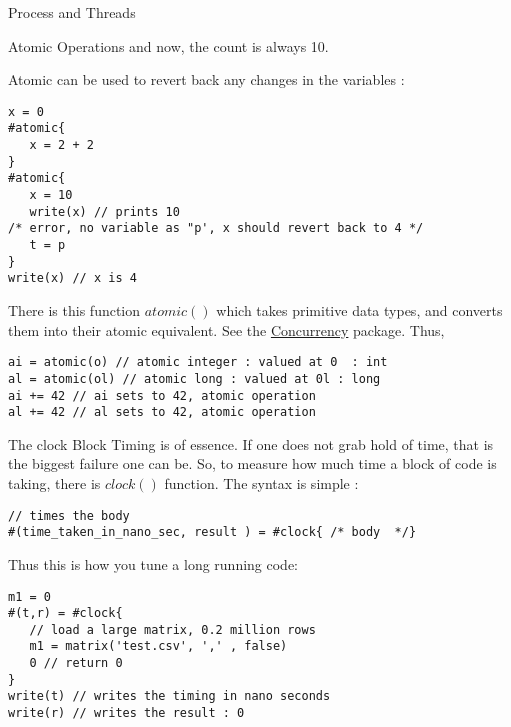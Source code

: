 \begin{section}{Process and Threads}
\begin{subsection}{Atomic Operations}
and now, the count is always 10.

Atomic can be used to revert back any changes in the variables :
\begin{lstlisting}[style=JexlStyle]
x = 0 
#atomic{
   x = 2 + 2    
}
#atomic{
   x = 10
   write(x) // prints 10 
/* error, no variable as "p', x should revert back to 4 */   
   t = p
}
write(x) // x is 4 
\end{lstlisting}

There is this function $atomic()$ which takes primitive data types,
and converts them into their atomic equivalent.
See the \href{https://docs.oracle.com/javase/8/docs/api/java/util/concurrent/atomic/package-summary.html}{Concurrency} package.
Thus,  
\begin{center}\begin{minipage}{\linewidth}
\begin{lstlisting}[style=JexlStyle]
ai = atomic(o) // atomic integer : valued at 0  : int 
al = atomic(ol) // atomic long : valued at 0l : long  
ai += 42 // ai sets to 42, atomic operation  
al += 42 // al sets to 42, atomic operation 
\end{lstlisting}
\end{minipage}\end{center}

\end{subsection}

\begin{subsection}{The clock Block}
Timing is of essence. If one does not grab hold of time, that is the biggest failure one can be.
So, to measure how much time a block of code is taking, there is $clock()$ function.
The syntax is simple :

\begin{lstlisting}[style=JexlStyle]
// times the body
#(time_taken_in_nano_sec, result ) = #clock{ /* body  */}
\end{lstlisting}
Thus this is how you tune a long running code:
\begin{center}\begin{minipage}{\linewidth}
\begin{lstlisting}[style=JexlStyle]
m1 = 0 
#(t,r) = #clock{
   // load a large matrix, 0.2 million rows 
   m1 = matrix('test.csv', ',' , false)
   0 // return 0 
}
write(t) // writes the timing in nano seconds 
write(r) // writes the result : 0  
\end{lstlisting}
\end{minipage}\end{center}


\end{subsection}
\end{section}

